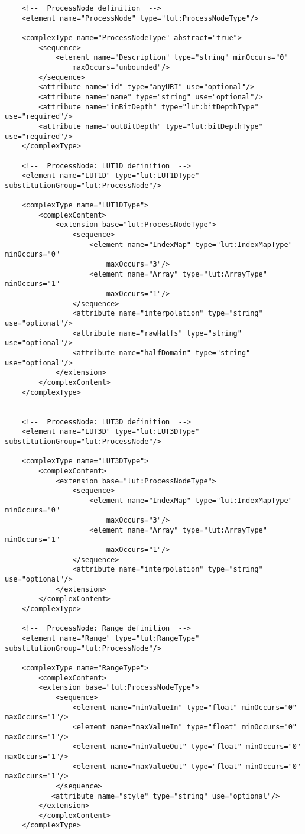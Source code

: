 \begin{lstlisting}
    <!--  ProcessNode definition  -->
    <element name="ProcessNode" type="lut:ProcessNodeType"/>

    <complexType name="ProcessNodeType" abstract="true">
        <sequence>
            <element name="Description" type="string" minOccurs="0" 
                maxOccurs="unbounded"/>
        </sequence>
        <attribute name="id" type="anyURI" use="optional"/>
        <attribute name="name" type="string" use="optional"/>
        <attribute name="inBitDepth" type="lut:bitDepthType" use="required"/>
        <attribute name="outBitDepth" type="lut:bitDepthType" use="required"/>
    </complexType>

    <!--  ProcessNode: LUT1D definition  -->
    <element name="LUT1D" type="lut:LUT1DType" substitutionGroup="lut:ProcessNode"/>

    <complexType name="LUT1DType">
        <complexContent>
            <extension base="lut:ProcessNodeType">
                <sequence>
                    <element name="IndexMap" type="lut:IndexMapType" minOccurs="0" 
                        maxOccurs="3"/>
                    <element name="Array" type="lut:ArrayType" minOccurs="1" 
                        maxOccurs="1"/>
                </sequence>
                <attribute name="interpolation" type="string" use="optional"/>
                <attribute name="rawHalfs" type="string" use="optional"/>
                <attribute name="halfDomain" type="string" use="optional"/>
            </extension>
        </complexContent>
    </complexType>


    <!--  ProcessNode: LUT3D definition  -->
    <element name="LUT3D" type="lut:LUT3DType" substitutionGroup="lut:ProcessNode"/>

    <complexType name="LUT3DType">
        <complexContent>
            <extension base="lut:ProcessNodeType">
                <sequence>
                    <element name="IndexMap" type="lut:IndexMapType" minOccurs="0" 
                        maxOccurs="3"/>
                    <element name="Array" type="lut:ArrayType" minOccurs="1" 
                        maxOccurs="1"/>
                </sequence>
                <attribute name="interpolation" type="string" use="optional"/>
            </extension>
        </complexContent>
    </complexType>

    <!--  ProcessNode: Range definition  -->
    <element name="Range" type="lut:RangeType" substitutionGroup="lut:ProcessNode"/>

    <complexType name="RangeType">
        <complexContent>
        <extension base="lut:ProcessNodeType">
            <sequence>
                <element name="minValueIn" type="float" minOccurs="0" maxOccurs="1"/>
                <element name="maxValueIn" type="float" minOccurs="0" maxOccurs="1"/>
                <element name="minValueOut" type="float" minOccurs="0" maxOccurs="1"/>
                <element name="maxValueOut" type="float" minOccurs="0" maxOccurs="1"/>
            </sequence>
           <attribute name="style" type="string" use="optional"/>
        </extension>
        </complexContent>
    </complexType>


\end{lstlisting}
